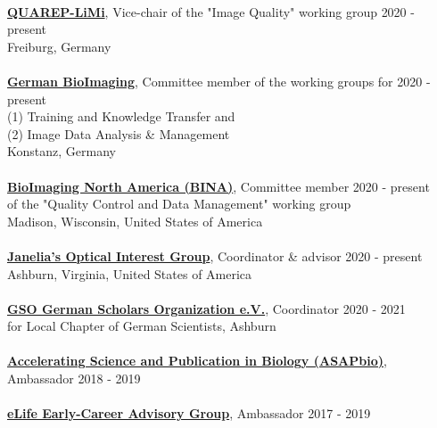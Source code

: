 \documentclass[margin,line]{res}
\begin{document}
\begin{resume}
\vspace*{-3mm}\\
{\bf \href{https://quarep.org/}{QUAREP-LiMi}}, Vice-chair of the "Image Quality" working group  \hfill {2020 - present}\\
Freiburg, Germany\\
\vspace*{-3mm}\\
{\bf \href{https://www.gerbi-gmb.de/}{German BioImaging}}, Committee member of the working groups for \hfill {2020 - present}\\
 (1)  Training and Knowledge Transfer and\\
(2) Image Data Analysis \& Management\\
Konstanz, Germany\\
\vspace*{-3mm}\\
{\bf \href{https://www.bioimagingna.org/}{BioImaging North America (BINA)}}, Committee member \hfill {2020 - present}\\
of the "Quality Control and Data Management" working group\\
Madison, Wisconsin, United States of America\\
\vspace*{-3mm}\\
{\bf \href{https://www.janelia.org/content/optical-interest-group}{Janelia's Optical Interest Group}}, Coordinator \& advisor  \hfill {2020 - present}\\
Ashburn, Virginia, United States of America\\
\vspace*{-3mm}\\
{\bf \href{https://www.gain-network.org/en/about-gain/gain-chapters/}{GSO German Scholars Organization e.V.}}, Coordinator  \hfill {2020 - 2021}\\
for Local Chapter of German Scientists, Ashburn\\
\vspace*{-3mm}\\
{\bf \href{https://asapbio.org/preprint-info/preprint-stories}{Accelerating Science and Publication in Biology (ASAPbio)}}, Ambassador \hfill {2018 - 2019}\\
\vspace*{-3mm}\\
{\bf \href{hhttps://elifesciences.org/inside-elife/912b0679/early-career-advisory-group-elife-welcomes-150-ambassadors-of-good-practice-in-science}{eLife Early-Career Advisory Group}}, Ambassador \hfill {2017 - 2019}\\

\end{resume}
\end{document}
